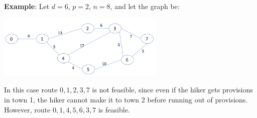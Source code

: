 \documentclass[11pt,fleqn]{exam}
\begin{document}
\vspace{.1in}

\noindent
{\bf Example}: Let $d=6$, $p=2$, $n=8$, and let the graph be:
\begin{center}
\includegraphics[width=0.6\textwidth]{planning-example.png}
\end{center}
In this case route $0,1,2,3,7$ is not feasible, since even if the hiker gets
provisions in town 1, the hiker cannot make it to town 2 before running out
of provisions. However, route $0,1,4,5,6,3,7$ is feasible.
\end{document}
